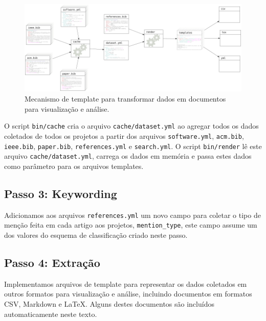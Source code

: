 \begin{figure}[h]
  \center
  \includegraphics[scale=0.3]{imagens/template-fluxograma.png}
  \caption{Mecanismo de template para transformar dados em documentos para visualização e análise.}
  \label{template-fluxograma}
\end{figure}


O script \texttt{bin/cache} cria o arquivo \texttt{cache/dataset.yml} ao
agregar todos os dados coletados de todos os projetos a partir dos arquivos
\texttt{software.yml}, \texttt{acm.bib}, \texttt{ieee.bib}, \texttt{paper.bib},
\texttt{references.yml} e \texttt{search.yml}.
O script \texttt{bin/render} lê este arquivo \texttt{cache/dataset.yml},
carrega os dados em memória e passa estes dados como parâmetro para os arquivos
templates.

\subsection{Passo 3: Keywording}

Adicionamos aos arquivos \texttt{references.yml} um novo campo para coletar o
tipo de menção feita em cada artigo aos projetos, \texttt{mention\_type}, este
campo assume um dos valores do esquema de classificação criado neste passo.

\subsection{Passo 4: Extração}

Implementamos arquivos de template para representar os dados coletados em
outros formatos para visualização e análise, incluindo documentos em formatos
CSV, Markdown e \LaTeX. Alguns destes documentos são incluídos automaticamente
neste texto.

